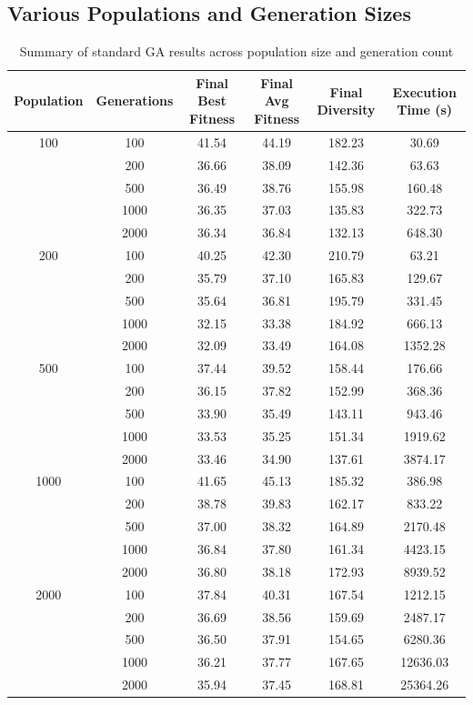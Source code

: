 \documentclass{article}
\begin{document}
\subsection{Various Populations and Generation Sizes}
\begin{table}[H]
\centering
\begin{tabular}{cccccc}
\toprule
\textbf{Population} & \textbf{Generations} & \textbf{Final Best Fitness} & \textbf{Final Avg Fitness} & \textbf{Final Diversity} & \textbf{Execution Time (s)} \\
\midrule
100 & 100 & 41.54 & 44.19 & 182.23 & 30.69 \\
 & 200 & 36.66 & 38.09 & 142.36 & 63.63 \\
 & 500 & 36.49 & 38.76 & 155.98 & 160.48 \\
 & 1000 & 36.35 & 37.03 & 135.83 & 322.73 \\
 & 2000 & 36.34 & 36.84 & 132.13 & 648.30 \\
\midrule
200 & 100 & 40.25 & 42.30 & 210.79 & 63.21 \\
 & 200 & 35.79 & 37.10 & 165.83 & 129.67 \\
 & 500 & 35.64 & 36.81 & 195.79 & 331.45 \\
 & 1000 & 32.15 & 33.38 & 184.92 & 666.13 \\
 & 2000 & 32.09 & 33.49 & 164.08 & 1352.28 \\
\midrule
500 & 100 & 37.44 & 39.52 & 158.44 & 176.66 \\
 & 200 & 36.15 & 37.82 & 152.99 & 368.36 \\
 & 500 & 33.90 & 35.49 & 143.11 & 943.46 \\
 & 1000 & 33.53 & 35.25 & 151.34 & 1919.62 \\
 & 2000 & 33.46 & 34.90 & 137.61 & 3874.17 \\
\midrule
1000 & 100 & 41.65 & 45.13 & 185.32 & 386.98 \\
 & 200 & 38.78 & 39.83 & 162.17 & 833.22 \\
 & 500 & 37.00 & 38.32 & 164.89 & 2170.48 \\
 & 1000 & 36.84 & 37.80 & 161.34 & 4423.15 \\
 & 2000 & 36.80 & 38.18 & 172.93 & 8939.52 \\
\midrule
2000 & 100 & 37.84 & 40.31 & 167.54 & 1212.15 \\
 & 200 & 36.69 & 38.56 & 159.69 & 2487.17 \\
 & 500 & 36.50 & 37.91 & 154.65 & 6280.36 \\
 & 1000 & 36.21 & 37.77 & 167.65 & 12636.03 \\
 & 2000 & 35.94 & 37.45 & 168.81 & 25364.26 \\
\bottomrule
\end{tabular}
\caption{Summary of standard GA results across population size and generation count}
\label{tab:ga_grid_summary}
\end{table}
\end{document}
